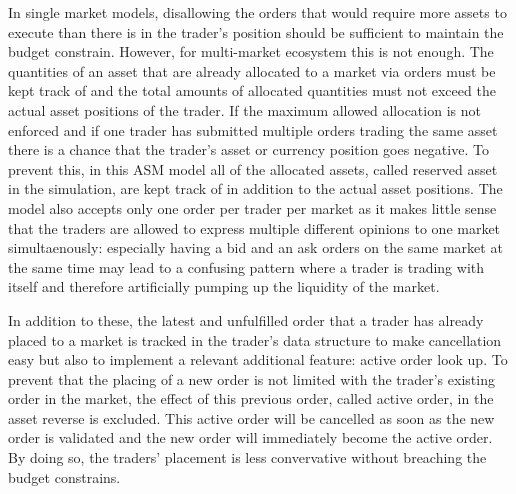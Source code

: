 In single market models, disallowing the orders that would require more assets to execute
than there is in the trader's position should be sufficient to maintain the budget constrain. 
However, for multi-market ecosystem this is not enough. The quantities of an asset 
that are already allocated to a market via orders must be kept track of and the total amounts of 
allocated quantities must not exceed the actual asset positions of the trader. If the maximum allowed 
allocation is not enforced and if one trader has submitted multiple orders trading the same asset
there is a chance that the trader's asset or currency position goes negative. 
To prevent this, in this ASM model all of the allocated assets, called reserved asset 
in the simulation, are kept track of in addition to the actual asset positions. The model also
accepts only one order per trader per market as it makes little sense that
the traders are allowed to express multiple different opinions to one market 
simultaenously: especially having a bid and an ask orders on the same market
at the same time may lead to a confusing pattern where a trader is trading with
itself and therefore artificially pumping up the liquidity of the market. 

In addition to these, the latest and unfulfilled order that a trader has already placed
to a market is tracked in the trader's data structure to make cancellation easy
but also to implement a relevant additional feature: active order look up. To prevent that
the placing of a new order is not limited with the trader's existing order in the market,
the effect of this previous order, called active order, in the asset reverse is excluded. 
This active order will be cancelled as soon as the new order is validated and the new order
will immediately become the active order. By doing so, the traders' placement is less 
convervative without breaching the budget constrains.


